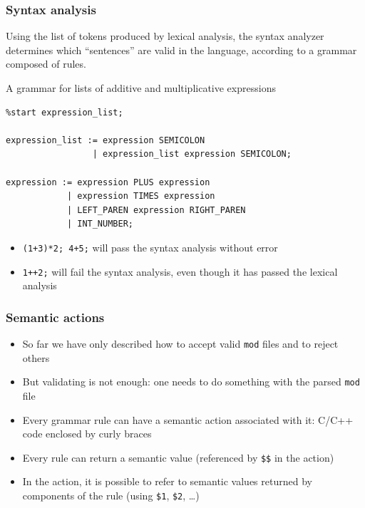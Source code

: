 \documentclass{beamer}
\begin{document}
\begin{frame}[fragile]
\frametitle{Syntax analysis}
Using the list of tokens produced by lexical analysis, the syntax analyzer determines which ``sentences'' are valid in the language, according to a \alert{grammar} composed of \alert{rules}.
\begin{block}{A grammar for lists of additive and multiplicative expressions}
\begin{footnotesize}
\begin{verbatim}
%start expression_list;

expression_list := expression SEMICOLON
                 | expression_list expression SEMICOLON;

expression := expression PLUS expression
            | expression TIMES expression
            | LEFT_PAREN expression RIGHT_PAREN
            | INT_NUMBER;
\end{verbatim}
\end{footnotesize}
\end{block}
\begin{itemize}
\item \texttt{(1+3)*2; 4+5;} will pass the syntax analysis without error
\item \texttt{1++2;} will fail the syntax analysis, even though it has passed the lexical analysis
\end{itemize}
\end{frame}

\begin{frame}
\frametitle{Semantic actions}
\begin{itemize}
\item So far we have only described how to accept valid \texttt{mod} files and to reject others
\item But validating is not enough: one needs to do something with the parsed \texttt{mod} file
\item Every grammar rule can have a \alert{semantic action} associated with it: C/C++ code enclosed by curly braces
\item Every rule can return a semantic value (referenced by \texttt{\$\$} in the action)
\item In the action, it is possible to refer to semantic values returned by components of the rule (using \texttt{\$1}, \texttt{\$2}, \ldots)
\end{itemize}
\end{frame}
\end{document}
